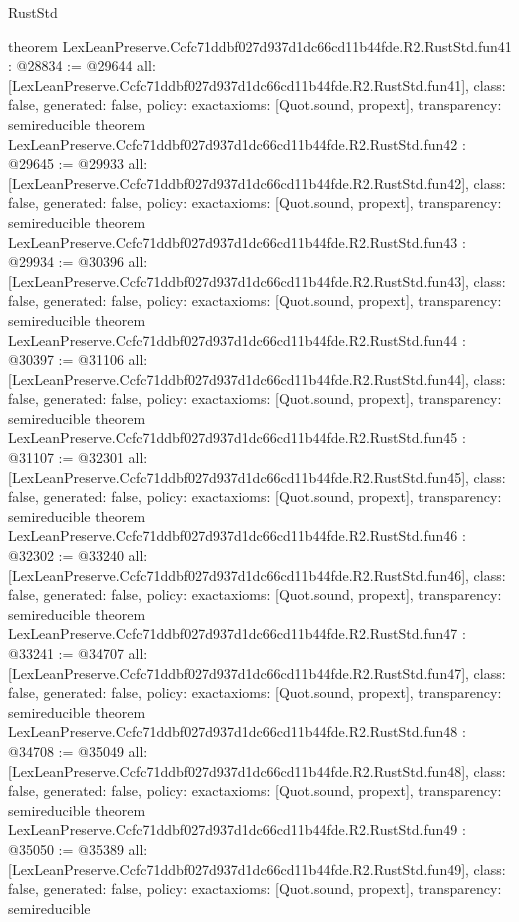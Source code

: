 \begin{lexlean}{RustStd}
\begin{coremodule}
{}
theorem LexLeanPreserve.Ccfc71ddbf027d937d1dc66cd11b44fde.R2.RustStd.fun41 : @28834 := @29644 {
  all: [LexLeanPreserve.Ccfc71ddbf027d937d1dc66cd11b44fde.R2.RustStd.fun41],
  class: false,
  generated: false,
  policy: exact{axioms: [Quot.sound, propext]},
  transparency: semireducible
}
theorem LexLeanPreserve.Ccfc71ddbf027d937d1dc66cd11b44fde.R2.RustStd.fun42 : @29645 := @29933 {
  all: [LexLeanPreserve.Ccfc71ddbf027d937d1dc66cd11b44fde.R2.RustStd.fun42],
  class: false,
  generated: false,
  policy: exact{axioms: [Quot.sound, propext]},
  transparency: semireducible
}
theorem LexLeanPreserve.Ccfc71ddbf027d937d1dc66cd11b44fde.R2.RustStd.fun43 : @29934 := @30396 {
  all: [LexLeanPreserve.Ccfc71ddbf027d937d1dc66cd11b44fde.R2.RustStd.fun43],
  class: false,
  generated: false,
  policy: exact{axioms: [Quot.sound, propext]},
  transparency: semireducible
}
theorem LexLeanPreserve.Ccfc71ddbf027d937d1dc66cd11b44fde.R2.RustStd.fun44 : @30397 := @31106 {
  all: [LexLeanPreserve.Ccfc71ddbf027d937d1dc66cd11b44fde.R2.RustStd.fun44],
  class: false,
  generated: false,
  policy: exact{axioms: [Quot.sound, propext]},
  transparency: semireducible
}
theorem LexLeanPreserve.Ccfc71ddbf027d937d1dc66cd11b44fde.R2.RustStd.fun45 : @31107 := @32301 {
  all: [LexLeanPreserve.Ccfc71ddbf027d937d1dc66cd11b44fde.R2.RustStd.fun45],
  class: false,
  generated: false,
  policy: exact{axioms: [Quot.sound, propext]},
  transparency: semireducible
}
theorem LexLeanPreserve.Ccfc71ddbf027d937d1dc66cd11b44fde.R2.RustStd.fun46 : @32302 := @33240 {
  all: [LexLeanPreserve.Ccfc71ddbf027d937d1dc66cd11b44fde.R2.RustStd.fun46],
  class: false,
  generated: false,
  policy: exact{axioms: [Quot.sound, propext]},
  transparency: semireducible
}
theorem LexLeanPreserve.Ccfc71ddbf027d937d1dc66cd11b44fde.R2.RustStd.fun47 : @33241 := @34707 {
  all: [LexLeanPreserve.Ccfc71ddbf027d937d1dc66cd11b44fde.R2.RustStd.fun47],
  class: false,
  generated: false,
  policy: exact{axioms: [Quot.sound, propext]},
  transparency: semireducible
}
theorem LexLeanPreserve.Ccfc71ddbf027d937d1dc66cd11b44fde.R2.RustStd.fun48 : @34708 := @35049 {
  all: [LexLeanPreserve.Ccfc71ddbf027d937d1dc66cd11b44fde.R2.RustStd.fun48],
  class: false,
  generated: false,
  policy: exact{axioms: [Quot.sound, propext]},
  transparency: semireducible
}
theorem LexLeanPreserve.Ccfc71ddbf027d937d1dc66cd11b44fde.R2.RustStd.fun49 : @35050 := @35389 {
  all: [LexLeanPreserve.Ccfc71ddbf027d937d1dc66cd11b44fde.R2.RustStd.fun49],
  class: false,
  generated: false,
  policy: exact{axioms: [Quot.sound, propext]},
  transparency: semireducible
}
\end{coremodule}
\end{lexlean}
